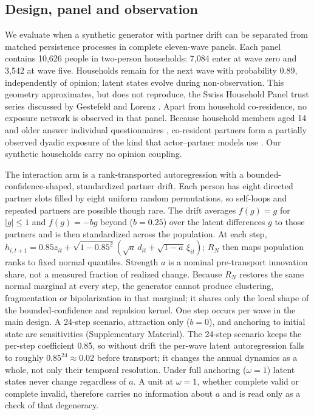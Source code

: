 \subsection{Design, panel and observation}

We evaluate when a synthetic generator with partner drift can be separated from matched persistence processes in complete eleven-wave panels. %
Each panel contains 10,626 people in two-person households: 7,084 enter at wave zero and 3,542 at wave five. %
Households remain for the next wave with probability 0.89, independently of opinion; latent states evolve during non-observation. %
This geometry approximates, but does not reproduce, the Swiss Household Panel trust series discussed by Gestefeld and Lorenz \cite{gestefeld2023}. %
Apart from household co-residence, no exposure network is observed in that panel. %
Because household members aged 14 and older answer individual questionnaires \cite{voorpostel2025shp}, co-resident partners form a partially observed dyadic exposure of the kind that actor--partner models use \cite{kim2024}. Our synthetic households carry no opinion coupling. %

The interaction arm is a rank-transported autoregression with a bounded-confidence-shaped, standardized partner drift. %
Each person has eight directed partner slots filled by eight uniform random permutations, so self-loops and repeated partners are possible though rare. The drift averages $f(g)=g$ for $|g|\le1$ and $f(g)=-bg$ beyond ($b=0.25$) over the latent differences $g$ to those partners and is then standardized across the population. %
At each step, $h_{i,t+1}=0.85z_{it}+\sqrt{1-0.85^2}(\sqrt a\,d_{it}+\sqrt{1-a}\,\xi_{it})$; $R_N$ then maps population ranks to fixed normal quantiles. %
Strength $a$ is a nominal pre-transport innovation share, not a measured fraction of realized change. %
Because $R_N$ restores the same normal marginal at every step, the generator cannot produce clustering, fragmentation or bipolarization in that marginal; it shares only the local shape of the bounded-confidence and repulsion kernel. %
One step occurs per wave in the main design. %
A 24-step scenario, attraction only ($b=0$), and anchoring to initial state are sensitivities (Supplementary Material). %
The 24-step scenario keeps the per-step coefficient 0.85, so without drift the per-wave latent autoregression falls to roughly $0.85^{24}\approx0.02$ before transport; it changes the annual dynamics as a whole, not only their temporal resolution. %
Under full anchoring ($\omega=1$) latent states never change regardless of $a$. A unit at $\omega=1$, whether complete valid or complete invalid, therefore carries no information about $a$ and is read only as a check of that degeneracy. %

